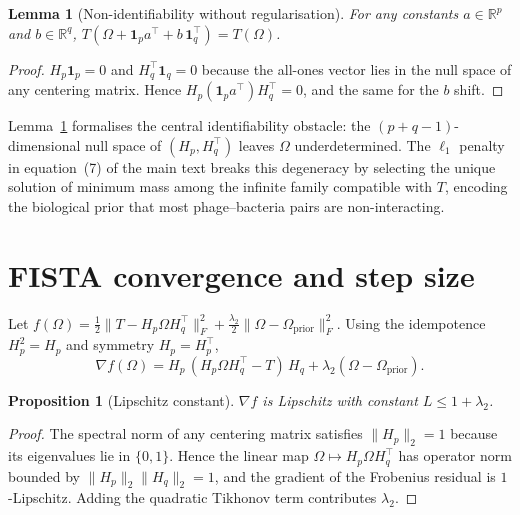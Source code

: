 \documentclass[11pt]{article}
\newcommand{\R}{\mathbb{R}}
\theoremstyle{plain}
\newtheorem{proposition}{Proposition}
\newtheorem{lemma}{Lemma}
\begin{document}
\begin{lemma}[Non-identifiability without regularisation]\label{lem:nonid}
For any constants $a \in \R^p$ and $b \in \R^q$,
$T(\Omega + \mathbf{1}_p a^\top + b\,\mathbf{1}_q^\top) = T(\Omega)$.
\end{lemma}

\begin{proof}
$H_p \mathbf{1}_p = 0$ and $H_q^\top \mathbf{1}_q = 0$ because the all-ones
vector lies in the null space of any centering matrix. Hence
$H_p(\mathbf{1}_p a^\top)H_q^\top = 0$, and the same for the $b$ shift.
\end{proof}

Lemma~\ref{lem:nonid} formalises the central identifiability obstacle: the
$(p+q-1)$-dimensional null space of $(H_p, H_q^\top)$ leaves $\Omega$
underdetermined. The $\ell_1$ penalty in equation~(7) of the main text breaks
this degeneracy by selecting the unique solution of minimum mass among the
infinite family compatible with $T$, encoding the biological prior that most
phage--bacteria pairs are non-interacting.

\section{FISTA convergence and step size}
\label{sec:fista}

Let $f(\Omega) = \tfrac{1}{2}\|T - H_p\Omega H_q^\top\|_F^2
+ \tfrac{\lambda_2}{2}\|\Omega - \Omega_{\mathrm{prior}}\|_F^2$. Using the
idempotence $H_p^2 = H_p$ and symmetry $H_p = H_p^\top$,
\begin{equation}
\nabla f(\Omega) = H_p\,(H_p \Omega H_q^\top - T)\,H_q
                 + \lambda_2 (\Omega - \Omega_{\mathrm{prior}}).
\end{equation}

\begin{proposition}[Lipschitz constant]
$\nabla f$ is Lipschitz with constant $L \leq 1 + \lambda_2$.
\end{proposition}

\begin{proof}
The spectral norm of any centering matrix satisfies $\|H_p\|_2 = 1$ because
its eigenvalues lie in $\{0, 1\}$. Hence the linear map
$\Omega \mapsto H_p \Omega H_q^\top$ has operator norm bounded by
$\|H_p\|_2 \|H_q\|_2 = 1$, and the gradient of the Frobenius residual is
$1$-Lipschitz. Adding the quadratic Tikhonov term contributes $\lambda_2$.
\end{proof}
\end{document}
